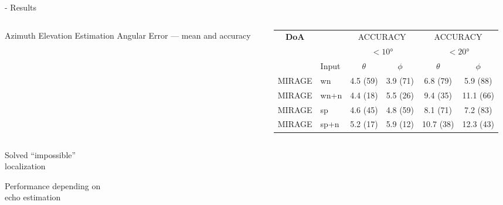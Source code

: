 \begin{frame}{\mirage - Results}
\begin{columns}[T,onlytextwidth]
\begin{column}{.74\textwidth}
        \end{column}
    \end{columns}

    \vfill

    \begin{columns}[T,onlytextwidth]
        \begin{column}{.25\textwidth}
            \begin{block}{Azimuth Elevation Estimation}
                Angular Error --- mean and accuracy
            \end{block}
        \end{column}

        \begin{column}{.74\textwidth}
            \centering
            \small
            \begin{tabular}{cl|cc|cc}
            \toprule
            \textbf{DoA}      &               &  \multicolumn{2}{c|}{ACCURACY} &   \multicolumn{2}{c}{ACCURACY} \\
                            &               &  \multicolumn{2}{c|}{$<\ang{10}$} &   \multicolumn{2}{c}{$<\ang{20}$} \\
                            &    Input    &  $\theta$ &  $\phi$ &  $\theta$ &  $\phi$ \\
            \midrule
            MIRAGE &  wn           &   4.5 (59) &  3.9 (71) &   6.8 (79) &   5.9 (88) \\
            MIRAGE &  wn+n     &   4.4 (18) &  5.5 (26) &   9.4 (35) &  11.1 (66) \\
            MIRAGE &  sp       &   4.6 (45) &  4.8 (59) &   8.1 (71) &   7.2 (83) \\
            MIRAGE &  sp+n &   5.2 (17) &  5.9 (12) &  10.7 (38) &  12.3 (43) \\
            \bottomrule
        \end{tabular}

        \end{column}

    \end{columns}

    \begin{center}
        \textcolor{mygreen}{\cmark \: \parbox{12em}{Solved ``impossible''\\localization}}
        \quad \textcolor{myred}{\xmark \: \parbox{12em}{Performance depending on\\echo estimation}}
    \end{center}

\end{frame}



